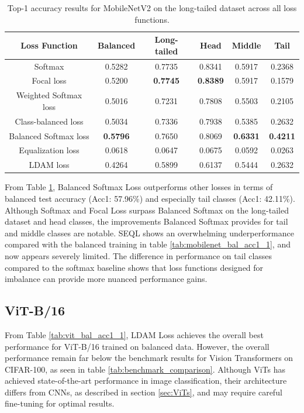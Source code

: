 \begin{table}[h!]
    \centering
    \caption{Top-1 accuracy results for MobileNetV2 on the long-tailed dataset across all loss functions.}
    \small
    \begin{tabular}{cccccc}
        \toprule
        Loss Function & Balanced & Long-tailed & Head & Middle & Tail \\ 
        \midrule
        Softmax   & 0.5282   & 0.7735 & 0.8341 & 0.5917 & 0.2368 \\
        Focal loss   & 0.5200   & \textbf{0.7745} & \textbf{0.8389} & 0.5917 & 0.1579 \\
        Weighted Softmax loss   & 0.5016   & 0.7231 & 0.7808 & 0.5503 & 0.2105 \\
        Class-balanced loss   &  0.5034  & 0.7336 & 0.7938 & 0.5385 & 0.2632 \\
        Balanced Softmax loss   & \textbf{0.5796}   & 0.7650 & 0.8069 & \textbf{0.6331} & \textbf{0.4211} \\
        Equalization loss   &   0.0618 & 0.0647 & 0.0675 & 0.0592 & 0.0263 \\
        LDAM loss   & 0.4264 & 0.5899 & 0.6137 & 0.5444 & 0.2632 \\
        \bottomrule
    \end{tabular}
    \label{tab:mobilenet_lt_acc1_1}
\end{table}

From Table \ref{tab:mobilenet_lt_acc1_1}, Balanced Softmax Loss outperforms other losses in terms of balanced test accuracy (Acc1: 57.96\%) and especially tail classes (Acc1: 42.11\%). Although Softmax and Focal Loss surpass Balanced Softmax on the long-tailed dataset and head classes, the improvements Balanced Softmax provides for tail and middle classes are notable. SEQL shows an overwhelming underperformance compared with the balanced training in table \ref{tab:mobilenet_bal_acc1_1}, and now appears severely limited. The difference in performance on tail classes compared to the softmax baseline shows that loss functions designed for imbalance can provide more nuanced performance gains.


\subsection{ViT-B/16}

From Table \ref{tab:vit_bal_acc1_1}, LDAM Loss achieves the overall best performance for ViT-B/16 trained on balanced data. However, the overall performance remain far below the benchmark results for Vision Transformers on CIFAR-100, as seen in table \ref{tab:benchmark_comparison}. Although ViTs has achieved state-of-the-art performance in image classification, their architecture differs from CNNs, as described in section \ref{sec:ViTs}, and may require careful fine-tuning for optimal results. 

